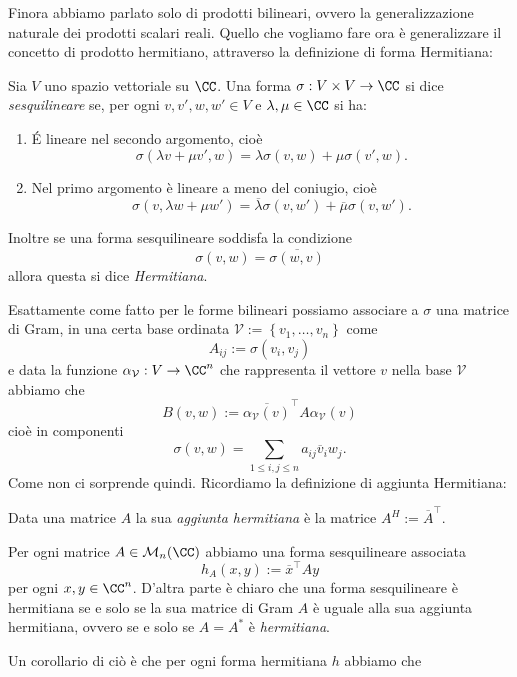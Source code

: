 \documentclass[11pt]{scrartcl}
\begin{document}
	Finora abbiamo parlato solo di prodotti bilineari, ovvero la generalizzazione naturale dei prodotti scalari reali. Quello che vogliamo fare ora è generalizzare il concetto di prodotto hermitiano, attraverso la definizione di forma Hermitiana:
	\begin{definition}
		Sia $V$ uno spazio vettoriale su $\CC$. Una forma $\sigma:V\times V\to \CC$ si dice \textit{sesquilineare} se, per ogni $v,v',w,w'\in V$ e $\lambda,\mu\in \CC$ si ha:
		\begin{enumerate}
			\item \'E lineare nel secondo argomento, cioè
			$$\sigma\left(\lambda v + \mu v ',w\right)={\lambda}\sigma\left(v,w\right)+{\mu}\sigma\left(v',w\right).$$
			\item Nel primo argomento è lineare a meno del coniugio, cioè
			$$\sigma\left(v,\lambda w + \mu w' \right)=\overline{\lambda}\sigma(v,w')+\overline{\mu}\sigma\left(v,w'\right).$$
		\end{enumerate}
		Inoltre se una forma sesquilineare soddisfa la condizione
		$$\sigma(v,w)=\overline{\sigma(w,v)}$$
		allora questa si dice \textit{Hermitiana}.
	\end{definition}
	Esattamente come fatto per le forme bilineari possiamo associare a $\sigma$ una matrice di Gram, in una certa base ordinata $\mathcal{V}:=\left\{v_1,\dots,v_n\right\}$ come
	$$A_{ij}:=\sigma\left(v_i,v_j\right)$$
	e data la funzione $\alpha_\mathcal{V}:V\to\CC^n$ che rappresenta il vettore $v$ nella base $\mathcal{V}$ abbiamo che 
	$$B(v,w):=\overline{\alpha_\mathcal{V}(v)}^\intercal A \alpha_{\mathcal{V}}(v)$$
	cioè in componenti
	$$\sigma(v,w)=\sum_{1\le i,j\le n}a_{ij}\overline{v}_iw_j.$$
	Come non ci sorprende quindi. Ricordiamo la definizione di aggiunta Hermitiana:
	\begin{definition}
		Data una matrice $A$ la sua \textit{aggiunta hermitiana} è la matrice $A^H:=\overline{A}^\intercal$.
	\end{definition}
	\begin{remark}
		Per ogni matrice $A\in \mathcal{M}_n(\CC)$ abbiamo una forma sesquilineare associata
		$$h_A(x,y):=\overline{x}^\intercal A y$$
		per ogni $x,y\in \CC^{n}$. D'altra parte è chiaro che una forma sesquilineare è hermitiana se e solo se la sua matrice di Gram $A$ è uguale alla sua aggiunta hermitiana, ovvero se e solo se $A=A^*$ è \textit{hermitiana}.
	\end{remark}
	Un corollario di ciò è che per ogni forma hermitiana $h$ abbiamo che 
\end{document}
